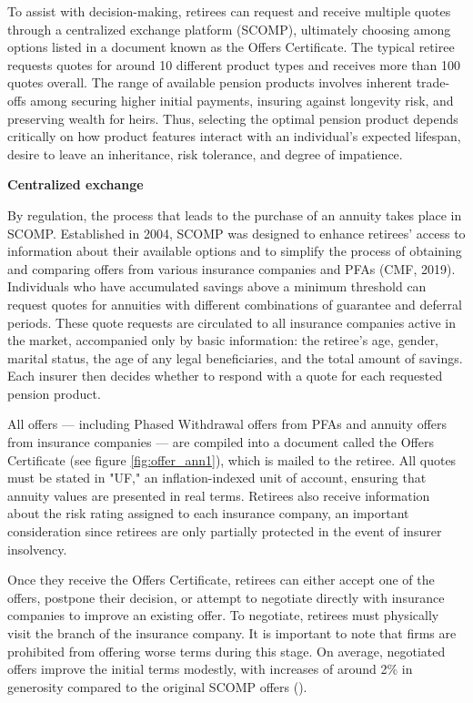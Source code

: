 \documentclass[12pt]{article}
\theoremstyle{plain}
\theoremstyle{plain}
\begin{document}
To assist with decision-making, retirees can request and receive multiple quotes through a centralized exchange platform (SCOMP), ultimately choosing among options listed in a document known as the Offers Certificate. The typical retiree requests quotes for around 10 different product types and receives more than 100 quotes overall.
The range of available pension products involves inherent trade-offs among securing higher initial payments, insuring against longevity risk, and preserving wealth for heirs. Thus, selecting the optimal pension product depends critically on how product features interact with an individual's expected lifespan, desire to leave an inheritance, risk tolerance, and degree of impatience. 


\textbf{Centralized exchange}

By regulation, the process that leads to the purchase of an annuity takes place in SCOMP.  Established in 2004, SCOMP was designed to enhance retirees' access to information about their available options and to simplify the process of obtaining and comparing offers from various insurance companies and PFAs (CMF, 2019). Individuals who have accumulated savings above a minimum threshold can request quotes for annuities with different combinations of guarantee and deferral periods. These quote requests are circulated to all insurance companies active in the market, accompanied only by basic information: the retiree’s age, gender, marital status, the age of any legal beneficiaries, and the total amount of savings. Each insurer then decides whether to respond with a quote for each requested pension product.

 
 

 All offers — including Phased Withdrawal offers from PFAs and annuity offers from insurance companies — are compiled into a  document called the Offers Certificate (see figure \ref{fig:offer_ann1}), which is mailed to the retiree. All quotes must be stated in "UF," an inflation-indexed unit of account, ensuring that annuity values are presented in real terms. Retirees also receive information about the risk rating assigned to each insurance company, an important consideration since retirees are only partially protected in the event of insurer insolvency. 
 
Once they receive the Offers Certificate, retirees can either accept one of the offers, postpone their decision, or attempt to negotiate directly with insurance companies to improve an existing offer. To negotiate, retirees must physically visit the branch of the insurance company. It is important to note that firms are prohibited from offering worse terms during this stage. On average, negotiated offers improve the initial terms modestly, with increases of around 2\% in generosity compared to the original SCOMP offers (\cite{illanes_retirement_2019}).
\end{document}
